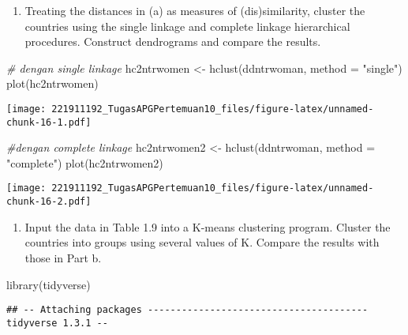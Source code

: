 \documentclass[
]{article}
\newenvironment{Shaded}{\begin{snugshade}}{\end{snugshade}}
\newcommand{\AttributeTok}[1]{\textcolor[rgb]{0.77,0.63,0.00}{#1}}
\newcommand{\CommentTok}[1]{\textcolor[rgb]{0.56,0.35,0.01}{\textit{#1}}}
\newcommand{\FunctionTok}[1]{\textcolor[rgb]{0.00,0.00,0.00}{#1}}
\newcommand{\NormalTok}[1]{#1}
\newcommand{\OtherTok}[1]{\textcolor[rgb]{0.56,0.35,0.01}{#1}}
\newcommand{\StringTok}[1]{\textcolor[rgb]{0.31,0.60,0.02}{#1}}
\providecommand{\tightlist}{%
  \setlength{\itemsep}{0pt}\setlength{\parskip}{0pt}}
\begin{document}
\begin{enumerate}
\def\labelenumi{(\alph{enumi})}
\setcounter{enumi}{1}
\tightlist
\item
  Treating the distances in (a) as measures of (dis)similarity, cluster
  the countries using the single linkage and complete linkage
  hierarchical procedures. Construct dendrograms and compare the
  results.
\end{enumerate}

\begin{Shaded}
\begin{Highlighting}[]
\CommentTok{\# dengan single linkage}
\NormalTok{hc2ntrwomen }\OtherTok{\textless{}{-}} \FunctionTok{hclust}\NormalTok{(ddntrwoman, }\AttributeTok{method =} \StringTok{"single"}\NormalTok{)}
\FunctionTok{plot}\NormalTok{(hc2ntrwomen)}
\end{Highlighting}
\end{Shaded}

\texttt{[image: 221911192\_TugasAPGPertemuan10\_files/figure-latex/unnamed-chunk-16-1.pdf]}

\begin{Shaded}
\begin{Highlighting}[]
\CommentTok{\#dengan complete linkage}
\NormalTok{hc2ntrwomen2 }\OtherTok{\textless{}{-}} \FunctionTok{hclust}\NormalTok{(ddntrwoman, }\AttributeTok{method =} \StringTok{"complete"}\NormalTok{)}
\FunctionTok{plot}\NormalTok{(hc2ntrwomen2)}
\end{Highlighting}
\end{Shaded}

\texttt{[image: 221911192\_TugasAPGPertemuan10\_files/figure-latex/unnamed-chunk-16-2.pdf]}

\begin{enumerate}
\def\labelenumi{(\alph{enumi})}
\setcounter{enumi}{2}
\tightlist
\item
  Input the data in Table 1.9 into a K-means clustering program. Cluster
  the countries into groups using several values of K. Compare the
  results with those in Part b.
\end{enumerate}

\begin{Shaded}
\begin{Highlighting}[]
\FunctionTok{library}\NormalTok{(tidyverse)}
\end{Highlighting}
\end{Shaded}

\begin{verbatim}
## -- Attaching packages --------------------------------------- tidyverse 1.3.1 --
\end{verbatim}
\end{document}
